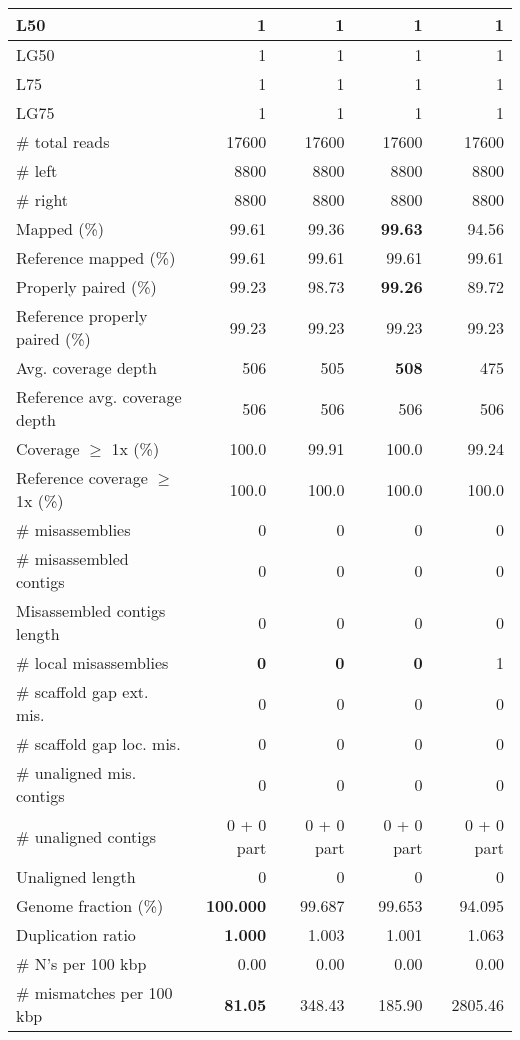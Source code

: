 \documentclass[12pt,a4paper]{article}
\begin{document}
\begin{table}[ht]
\begin{center}
\begin{tabular}{|l*{4}{|r}|}
L50 & 1 & 1 & 1 & 1 \\ \hline
LG50 & 1 & 1 & 1 & 1 \\ \hline
L75 & 1 & 1 & 1 & 1 \\ \hline
LG75 & 1 & 1 & 1 & 1 \\ \hline
\# total reads & 17600 & 17600 & 17600 & 17600 \\ \hline
\# left & 8800 & 8800 & 8800 & 8800 \\ \hline
\# right & 8800 & 8800 & 8800 & 8800 \\ \hline
Mapped (\%) & 99.61 & 99.36 & {\bf 99.63} & 94.56 \\ \hline
Reference mapped (\%) & 99.61 & 99.61 & 99.61 & 99.61 \\ \hline
Properly paired (\%) & 99.23 & 98.73 & {\bf 99.26} & 89.72 \\ \hline
Reference properly paired (\%) & 99.23 & 99.23 & 99.23 & 99.23 \\ \hline
Avg. coverage depth & 506 & 505 & {\bf 508} & 475 \\ \hline
Reference avg. coverage depth & 506 & 506 & 506 & 506 \\ \hline
Coverage $\geq$ 1x (\%) & 100.0 & 99.91 & 100.0 & 99.24 \\ \hline
Reference coverage $\geq$ 1x (\%) & 100.0 & 100.0 & 100.0 & 100.0 \\ \hline
\# misassemblies & 0 & 0 & 0 & 0 \\ \hline
\# misassembled contigs & 0 & 0 & 0 & 0 \\ \hline
Misassembled contigs length & 0 & 0 & 0 & 0 \\ \hline
\# local misassemblies & {\bf 0} & {\bf 0} & {\bf 0} & 1 \\ \hline
\# scaffold gap ext. mis. & 0 & 0 & 0 & 0 \\ \hline
\# scaffold gap loc. mis. & 0 & 0 & 0 & 0 \\ \hline
\# unaligned mis. contigs & 0 & 0 & 0 & 0 \\ \hline
\# unaligned contigs & 0 + 0 part & 0 + 0 part & 0 + 0 part & 0 + 0 part \\ \hline
Unaligned length & 0 & 0 & 0 & 0 \\ \hline
Genome fraction (\%) & {\bf 100.000} & 99.687 & 99.653 & 94.095 \\ \hline
Duplication ratio & {\bf 1.000} & 1.003 & 1.001 & 1.063 \\ \hline
\# N's per 100 kbp & 0.00 & 0.00 & 0.00 & 0.00 \\ \hline
\# mismatches per 100 kbp & {\bf 81.05} & 348.43 & 185.90 & 2805.46 \\ \hline

\end{tabular}
\end{center}
\end{table}
\end{document}
